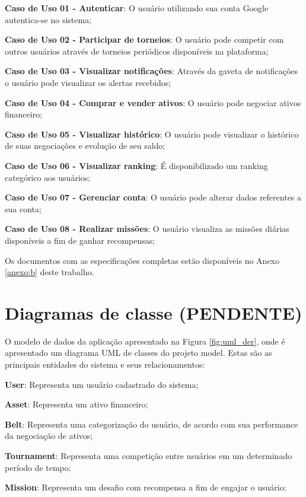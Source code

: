 \begin{lista}
  \item \textbf{Caso de Uso 01 - Autenticar}: O usuário utilizando sua conta Google autentica-se no sistema;
  \item \textbf{Caso de Uso 02 - Participar de torneios}: O usuário pode competir com outros usuários através de torneios periódicos disponíveis na plataforma;
  \item \textbf{Caso de Uso 03 - Visualizar notificações}: Através da gaveta de notificações o usuário pode visualizar os alertas recebidos;
  \item \textbf{Caso de Uso 04 - Comprar e vender ativos}: O usuário pode negociar ativos financeiro;
  \item \textbf{Caso de Uso 05 - Visualizar histórico}: O usuário pode visualizar o histórico de suas negociações e evolução de seu saldo;
  \item \textbf{Caso de Uso 06 - Visualizar ranking}: É disponibilizado um ranking categórico aos usuários;
  \item \textbf{Caso de Uso 07 - Gerenciar conta}: O usuário pode alterar dados referentes a sua conta;
  \item \textbf{Caso de Uso 08 - Realizar missões}: O usuário visualiza as missões diárias disponíveis a fim de ganhar recompensas;
\end{lista}

Os documentos com as especificações completas estão disponíveis no Anexo \ref{anexo:b} deste trabalho.

\section{Diagramas de classe (PENDENTE)} \label{sec:modelagem:classe}

O modelo de dados da aplicação apresentado na Figura \ref{fig:uml_der}, onde é apresentado um diagrama UML de classes do projeto model. Estas são as principais entidades do sistema e seus relacionamentos:

\begin{lista}
  \item \textbf{User}: Representa um usuário cadastrado do sistema;
  \item \textbf{Asset}: Representa um ativo financeiro;
  \item \textbf{Belt}: Representa uma categorização do usuário, de acordo com sua performance da negociação de ativos;
  \item \textbf{Tournament}: Representa uma competição entre usuários em um determinado período de tempo;
  \item \textbf{Mission}: Representa um desafio com recompensa a fim de engajar o usuário;
\end{lista}


